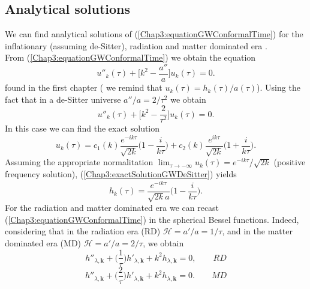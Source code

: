 \documentclass[11pt,a4paper,twoside]{book}
\begin{document}
\subsection{Analytical solutions}
We can find  analytical solutions of (\ref{Chap3:equationGWConformalTime}) for the inflationary (assuming de-Sitter), radiation and matter dominated era \cite{Chap3:GW_Watanabe_Komatsu}.\\
From (\ref{Chap3:equationGWConformalTime}) we obtain the equation 
\begin{equation}
	\label{Chap3:eomMasslessDesitter}
	u''_{k}(\tau) + \Big[k^{2} - \frac{a''}{a}\Big]u_{k}(\tau) = 0.
\end{equation}
found in the first chapter ( we remind that $ u_{k}(\tau) = h_{k}(\tau)/a(\tau) $). Using the fact that in a de-Sitter universe $ a''/a = 2/\tau^{2}  $ we obtain
\begin{equation}
	\label{eomMasslessDesitter2}
	u''_{k}(\tau) + \Big[k^{2} - \frac{2}{\tau^{2}}\Big]u_{k}(\tau) = 0.
\end{equation}
In this case we can find the exact solution 
\begin{equation}
	\label{Chap3:exactSolutionGWDeSitter}
	u_{k}(\tau) = c_{1}(k) \frac{e^{-ik\tau}}{\sqrt{2k}}\Big (1-\frac{i}{k\tau}\Big) + c_{2}(k) \frac{e^{ik\tau}}{\sqrt{2k}}\Big (1+\frac{i}{k\tau}\Big).
\end{equation}
Assuming the appropriate normalitation $ \lim_{\tau \rightarrow -\infty} u_{k}(\tau) = e^{-ik\tau}/\sqrt{2k}$ (positive frequency solution), (\ref{Chap3:exactSolutionGWDeSitter}) yields
\begin{equation}
	\label{Chap3:solutionBunchDavis}
h_{k}(\tau)= \frac{e^{-ik\tau}}{\sqrt{2k}a}\Big (1-\frac{i}{k\tau}\Big).
\end{equation}
For the radiation and matter dominated era we can recast (\ref{Chap3:equationGWConformalTime}) in the spherical Bessel functions. Indeed, considering that in the radiation era (RD) $\mathcal{H}= a'/a = 1/\tau$, and in the matter dominated era (MD) $\mathcal{H}=a'/a=2/\tau$, we obtain
\begin{equation}
	\label{Chap3:RadiationEra}
		h''_{\lambda,\textbf{k}} + \Big (\frac{1}{\tau}\Big)h'_{\lambda,\textbf{k}} + k^{2}h_{\lambda,\textbf{k}} = 0,
		\qquad
		RD
\end{equation}
\begin{equation}
	\label{Chap3:MatterEra}
	h''_{\lambda,\textbf{k}} + \Big (\frac{2}{\tau}\Big)h'_{\lambda,\textbf{k}} + k^{2}h_{\lambda,\textbf{k}} = 0.
	\qquad
	MD
\end{equation}
\end{document}
